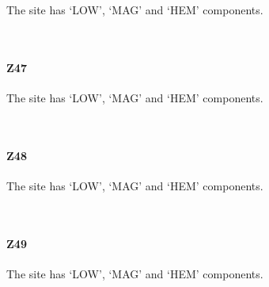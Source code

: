 \documentclass[11pt]{article}
\begin{document}
    The site has `LOW', `MAG' and `HEM' components.



    \begin{center}
    \end{center}
    { \hspace*{\fill} \\}
    
    \newpage
    
    \paragraph{Z47}\label{z47}

    The site has `LOW', `MAG' and `HEM' components.



    \begin{center}
    \end{center}
    { \hspace*{\fill} \\}
    
    \newpage
    
    \paragraph{Z48}\label{z48}

    The site has `LOW', `MAG' and `HEM' components.



    \begin{center}
    \end{center}
    { \hspace*{\fill} \\}
    
    \newpage
    
    \paragraph{Z49}\label{z49}

    The site has `LOW', `MAG' and `HEM' components.



    \begin{center}
    \end{center}
    { \hspace*{\fill} \\}
    
\end{document}

